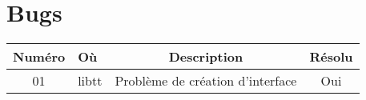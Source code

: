 \section{Bugs}
\begin{tabular}{| c | l | c | c |}
\hline
Numéro & Où & Description & Résolu \\
\hline
01 & libtt & Problème de création d'interface & Oui \\
\hline
\end{tabular}
